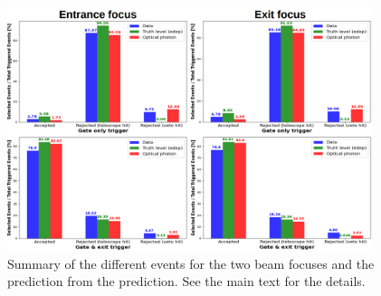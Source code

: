 \begin{refsection}
            \begin{figure}
                \centering
                \includegraphics[width = 0.95\textwidth]{Figures/muEDM_Nov2022/shanghai_summary.png}
                \caption[muEDM 2022: data and \gf events]{Summary of the different events for the two beam focuses and the prediction from the \gfb prediction. See the main text for the details.}
                \label{fig:muEDM:bt2022:summary}
            \end{figure}


\end{refsection}
